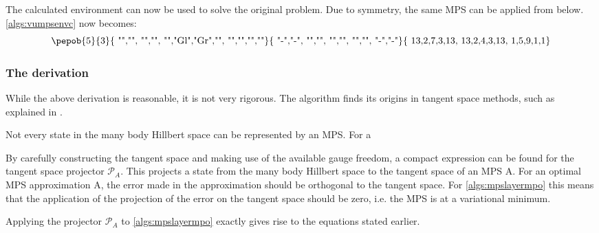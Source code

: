 The calculated environment can now be used to solve the original problem. Due to symmetry, the same MPS can be applied from below. \cref{algs:vumpsenvc} now becomes:
\begin{equation}
  \vcenter{ \hbox{   \pepob{5}{3}{{
            "","", "","",
            "","Gl","Gr","",
            "","","",""}}{{
            "-","-",
            "","",
            "","",
            "","",
            "-","-"}}{{
            13,2,7,3,13,
            13,2,4,3,13,
            1,5,9,1,1}} }}
\end{equation}

\subsubsection{The derivation}\label{vumps_Deriv}
While the above derivation is reasonable, it is not very rigorous. The algorithm finds its origins  in tangent space methods, such as explained in \cite{Vanderstraeten2019}.

Not every state in the many body Hillbert space can be represented by an MPS. For a

By carefully constructing the tangent space and making use of the available gauge freedom, a compact expression can be found for the tangent space projector $\mathcal{P}_A$. This projects a state from the many body Hillbert space to the tangent space of an MPS A. For an optimal MPS approximation A, the error made in the approximation should be orthogonal to the tangent space. For \cref{algs:mpslayermpo} this means that the application of the projection of the error on the tangent space should be zero, i.e. the MPS is at a variational minimum.  \cite{Nietner2020}

Applying the projector $\mathcal{P}_A$ to \cref{algs:mpslayermpo} exactly gives rise to the equations stated earlier.

